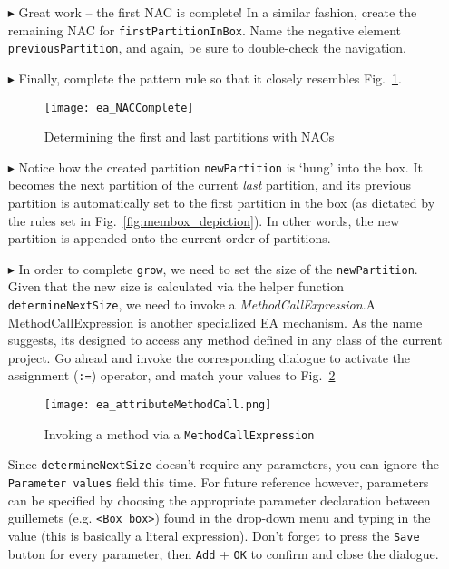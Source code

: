 \begin{itemize}
\item[$\blacktriangleright$] Great work -- the first NAC is complete! In a similar fashion, create the remaining NAC for \texttt{firstPartitionInBox}. Name the
negative element \texttt{previousPartition}, and again, be sure to double-check the navigation.

\item[$\blacktriangleright$] Finally, complete the pattern rule so that it closely resembles Fig.~\ref{fig:sdm_grow_3}. 

\begin{figure}[htbp]
\begin{center}
  \texttt{[image: ea\_NACComplete]} 
  \caption{Determining the first and last partitions with NACs}  
  \label{fig:sdm_grow_3}
\end{center}
\end{figure}
 
\item[$\blacktriangleright$] Notice how the created partition \texttt{newPartition} is `hung' into the box. It becomes the next partition of the current
\emph{last} partition, and its previous partition is automatically set to the first partition in the box (as dictated by the rules set in
Fig.~\ref{fig:membox_depiction}). In other words, the new partition is appended onto the current order of partitions.

\item[$\blacktriangleright$] In order to complete \texttt{grow}, we need to set the size of the \texttt{newPartition}. Given that the new size is calculated
via the helper function \texttt{det\-er\-mine\-Next\-Size}, we need to invoke a \emph{MethodCallExpression}.A MethodCallExpression
is another specialized EA mechanism. As the name suggests, its designed to access any method defined in any class of the current project. Go ahead and invoke
the corresponding dialogue to activate the assignment (\texttt{:=}) operator, and match your values to Fig.~\ref{fig:sdm_grow_4}
 
\begin{figure}[htbp]
\begin{center}
  \texttt{[image: ea\_attributeMethodCall.png]}
  \caption{Invoking a method via a \texttt{MethodCallExpression}}  
  \label{fig:sdm_grow_4} 
\end{center}
\end{figure}

Since \texttt{determineNextSize} doesn't require any parameters, you can ignore the \texttt{Parameter values} field this time. For future reference however,
parameters can be specified by choosing the appropriate parameter declaration between guillemets (e.g. \texttt{<Box box>}) found in the drop-down menu and typing in the
value (this is basically a literal expression). Don't forget to press the \texttt{Save} button for every parameter, then \texttt{Add} + \texttt{OK} to confirm
and close the dialogue.


\end{itemize}
